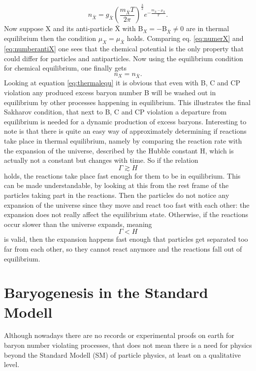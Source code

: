 \begin{equation}
	n_{\bar{X}}=g_{\bar{X}}\left(\frac{m_{\bar{X}}T}{2\pi}\right)^\frac{3}{2}e^{-\frac{m_{\bar{X}}-\mu_{\bar{X}}}{T}}.
\label{eq:numberantiX}
\end{equation}
Now suppose X and its anti-particle $\bar{\text{X}}$  with B$_X=-$B$_{\bar{X}}\neq0$ are in thermal equilibrium then the condition $\mu_X=\mu_{\bar{X}}$ holds. Comparing eq. \eqref{eq:numerX} and \eqref{eq:numberantiX} one sees that the chemical potential is the only property that could differ for particles and antiparticles. Now using the equilibrium condition for chemical equilibrium, one finally gets
\begin{equation}
	n_X=n_{\bar{X}}.
	\label{eq:thermalequ}
\end{equation}
Looking at equation \eqref{eq:thermalequ} it is obvious that even with B, C and CP violation any produced excess baryon number B will be washed out in equilibrium by other processes happening in equilibrium. \newline\indent
This illustrates the final Sakharov condition, that next to B, C and CP violation a departure from equilibrium is needed for a dynamic production of excess baryons. \newline\indent
Interesting to note is that there is quite an easy way of approximately determining if reactions take place in thermal equilibrium, namely by comparing the reaction rate with the expansion of the universe, described by the Hubble constant H, which is actually not a constant but changes with time. So if the relation 
\begin{equation}
	\Gamma\gtrsim H
	\label{eq:rate_g_hubble}
\end{equation}
holds, the reactions take place fast enough for them to be in equilibrium. This can be made understandable, by looking at this from the rest frame of the particles taking part in the reactions. Then the particles do not notice any expansion of the universe since they move and react too fast with each other: the expansion does not really affect the equilibrium state. \newline\indent
Otherwise, if the reactions occur slower than the universe expands, meaning
\begin{equation}
	\Gamma<H
	\label{eq:rate_s_hubble}
\end{equation}
is valid, then the expansion happens fast enough that particles get separated too far from each other, so they cannot react anymore and the reactions fall out of equilibrium.
\section{Baryogenesis in the Standard Modell}
Although nowadays there are no records or experimental proofs on earth for baryon number violating processes, that does not mean there is a need for physics beyond the Standard Modell (SM) of particle physics, at least on a qualitative level.
